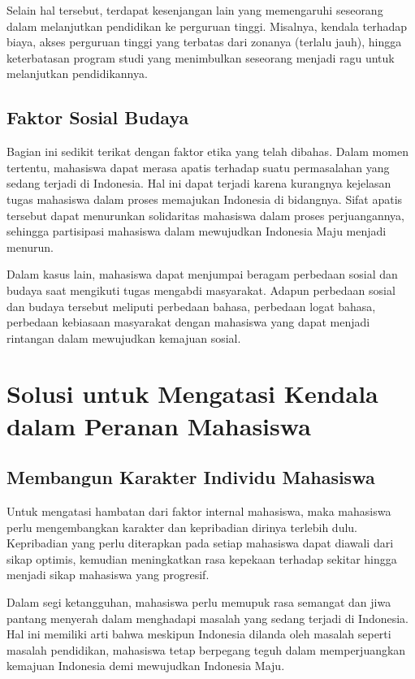 Selain hal tersebut, terdapat kesenjangan lain yang memengaruhi seseorang dalam melanjutkan pendidikan ke perguruan tinggi. Misalnya, kendala terhadap biaya, akses perguruan tinggi yang terbatas dari zonanya (terlalu jauh), hingga keterbatasan program studi yang menimbulkan seseorang menjadi ragu untuk melanjutkan pendidikannya.

\subsection{Faktor Sosial Budaya}

Bagian ini sedikit terikat dengan faktor etika yang telah dibahas. Dalam momen tertentu, mahasiswa dapat merasa apatis terhadap suatu permasalahan yang sedang terjadi di Indonesia. Hal ini dapat terjadi karena kurangnya kejelasan tugas mahasiswa dalam proses memajukan Indonesia di bidangnya. Sifat apatis tersebut dapat menurunkan solidaritas mahasiswa dalam proses perjuangannya, sehingga partisipasi mahasiswa dalam mewujudkan Indonesia Maju menjadi menurun.

Dalam kasus lain, mahasiswa dapat menjumpai beragam perbedaan sosial dan budaya saat mengikuti tugas mengabdi masyarakat. Adapun perbedaan sosial dan budaya tersebut meliputi perbedaan bahasa, perbedaan logat bahasa, perbedaan kebiasaan masyarakat dengan mahasiswa yang dapat menjadi rintangan dalam mewujudkan kemajuan sosial.


\section{Solusi untuk Mengatasi Kendala dalam Peranan Mahasiswa}

\subsection{Membangun Karakter Individu Mahasiswa}

Untuk mengatasi hambatan dari faktor internal mahasiswa, maka mahasiswa perlu mengembangkan karakter dan kepribadian dirinya terlebih dulu. Kepribadian yang perlu diterapkan pada setiap mahasiswa dapat diawali dari sikap optimis, kemudian meningkatkan rasa kepekaan terhadap sekitar hingga menjadi sikap mahasiswa yang progresif.

Dalam segi ketangguhan, mahasiswa perlu memupuk rasa semangat dan jiwa pantang menyerah dalam menghadapi masalah yang sedang terjadi di Indonesia. Hal ini memiliki arti bahwa meskipun Indonesia dilanda oleh masalah seperti masalah pendidikan, mahasiswa tetap berpegang teguh dalam memperjuangkan kemajuan Indonesia demi mewujudkan Indonesia Maju.

